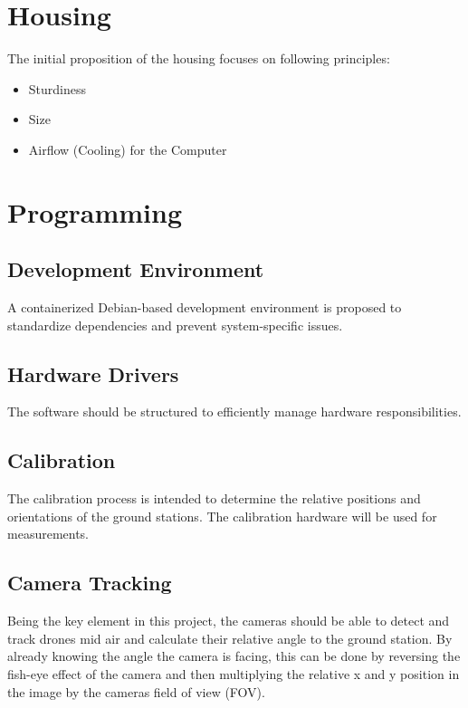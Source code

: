 \section{Housing}

The initial proposition of the housing focuses on following principles:
\begin{itemize}
	\item Sturdiness
	\item Size
	\item Airflow (Cooling) for the Computer
\end{itemize}


\section{Programming}

\subsection{Development Environment}

A containerized Debian-based development environment is proposed to standardize dependencies and prevent system-specific issues.

\subsection{Hardware Drivers}

The software should be structured to efficiently manage hardware responsibilities.

\subsection{Calibration}

The calibration process is intended to determine the relative positions and orientations of the ground stations. The calibration hardware will be used for measurements.

\subsection{Camera Tracking}
Being the key element in this project, the cameras should be able to detect and track drones mid air and calculate their relative angle to the ground station. By already knowing the angle the camera is facing, this can be done by reversing the fish-eye effect of the camera and then multiplying the relative x and y position in the image by the cameras field of view (FOV).

